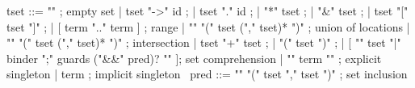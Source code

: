 \begin{syntax}
  tset ::= { "\empty" } ; empty set
       | tset "->" id ;
       | tset "." id ;
       | "*" tset ;
       | "&" tset ;
       | tset "[" tset "]" ;
       | [ { term ".." term } ] ; range
       | { "\union" "(" tset ("," tset)* ")" } ; union of locations
       | { "\inter" "(" tset ("," tset)* ")" }; intersection
       | tset "+" tset ;
       | "(" tset ")" ;
       | [ { "{" tset "|" binder ";" guards ("&&" pred)? "}" } ]; set comprehension
       | { "{" term "}" } ; explicit singleton
       | term ; implicit singleton
       \
  pred ::= { "\subset" "(" tset "," tset ")" } ; set inclusion
\end{syntax}
